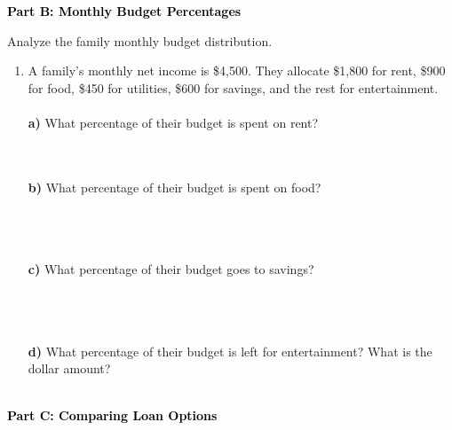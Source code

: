 \documentclass[12pt, letterpaper, fleqn]{article}
\begin{document}
\newpage

\begin{tcolorbox}[colback=black!10]
    \large\textcolor{black}{\textbf{Part B: Monthly Budget Percentages}}
\end{tcolorbox}

\vspace{3mm}

\noindent
Analyze the family monthly budget distribution.

\vspace{5mm}

\begin{enumerate}[itemsep=2.5cm, leftmargin=0.6cm]
\item A family's monthly net income is \$4,500. They allocate \$1,800 for rent, \$900 for food, \$450 for utilities, \$600 for savings, and the rest for entertainment. \\ \\
\textbf{a)} What percentage of their budget is spent on rent? \\ \\
 \\ 
\vspace{1.3cm}

\textbf{b)} What percentage of their budget is spent on food? \\ \\
 \\ \\
\vspace{1.3cm}

\textbf{c)} What percentage of their budget goes to savings? \\ \\
 \\ \\
\vspace{1.3cm}

\textbf{d)} What percentage of their budget is left for entertainment? What is the dollar amount? \\ \\

\end{enumerate}

\newpage

\begin{tcolorbox}[colback=black!10]
    \large\textcolor{black}{\textbf{Part C: Comparing Loan Options}}
\end{tcolorbox}
\end{document}
